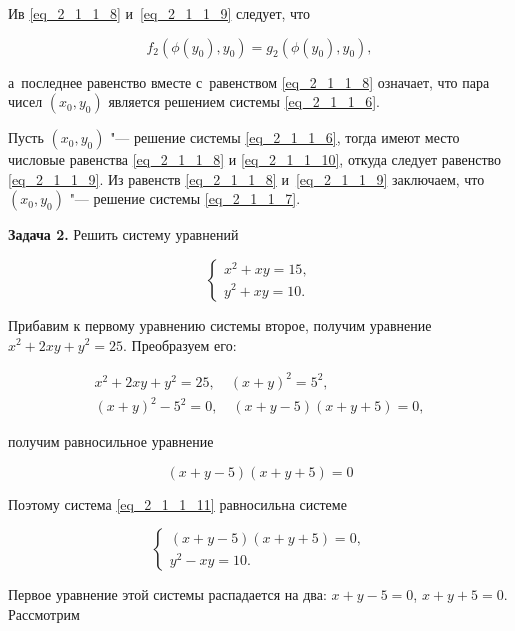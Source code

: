 \begin{enumerate}
Ив \eqref{eq_2_1_1_8} и~\eqref{eq_2_1_1_9} следует, что

\begin{equation}\label{eq_2_1_1_10}
f_{2}(\phi(y_{0}), y_{0}) = g_{2}(\phi(y_{0}), y_{0}),
\end{equation}

а~последнее равенство вместе с~равенством \eqref{eq_2_1_1_8} означает,
что пара чисел $(x_{0}, y_{0})$ является решением системы \eqref{eq_2_1_1_6}.

Пусть $(x_{0}, y_{0})$ "--- решение системы \eqref{eq_2_1_1_6}, тогда
имеют место числовые равенства \eqref{eq_2_1_1_8} и \eqref{eq_2_1_1_10},
откуда следует равенство \eqref{eq_2_1_1_9}.
Из равенств \eqref{eq_2_1_1_8} и~\eqref{eq_2_1_1_9} заключаем, что $(x_{0}, y_{0})$
"--- решение системы \eqref{eq_2_1_1_7}.

\textbf{Задача 2.}\label{ex_2_1_1_2} Решить систему уравнений

\begin{equation}\label{eq_2_1_1_11}
\begin{cases}
x^{2} + xy = 15, \\
y^{2} + xy = 10.
\end{cases}
\end{equation}

Прибавим к первому уравнению системы второе, получим уравнение
$x^{2} + 2xy + y^{2} = 25$. Преобразуем его:

\begin{gather*}
x^{2} + 2xy + y^{2} = 25, \quad (x + y)^{2} = 5^{2}, \\
(x + y)^{2} - 5^{2} = 0, \quad (x + y - 5)(x + y + 5) = 0,
\end{gather*}

получим равносильное уравнение

\begin{equation}\label{eq_2_1_1_12}
(x + y - 5)(x + y + 5) = 0
\end{equation}

Поэтому система \eqref{eq_2_1_1_11} равносильна системе

\begin{equation}\label{eq_2_1_1_13}
\begin{cases}
(x + y - 5)(x + y + 5) = 0, \\
y^{2} - xy = 10.
\end{cases}
\end{equation}

Первое уравнение этой системы распадается на два: $x + y - 5 = 0$,
$x + y + 5 = 0$. Рассмотрим


\end{enumerate}
